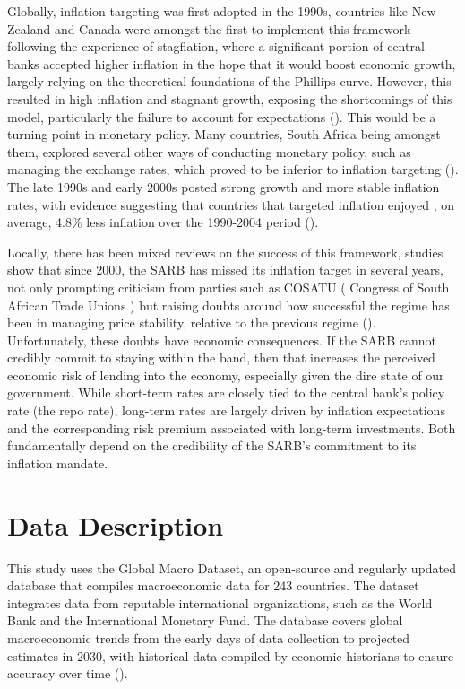 \documentclass[11pt,preprint]{elsarticle}
\numberwithin{equation}{section}
\numberwithin{figure}{section}
\numberwithin{table}{section}
\begin{document}
Globally, inflation targeting was first adopted in the 1990s, countries
like New Zealand and Canada were amongst the first to implement this
framework following the experience of stagflation, where a significant
portion of central banks accepted higher inflation in the hope that it
would boost economic growth, largely relying on the theoretical
foundations of the Phillips curve. However, this resulted in high
inflation and stagnant growth, exposing the shortcomings of this model,
particularly the failure to account for expectations
(). This would be a
turning point in monetary policy. Many countries, South Africa being
amongst them, explored several other ways of conducting monetary policy,
such as managing the exchange rates, which proved to be inferior to
inflation targeting (). The late 1990s and early 2000s posted strong growth
and more stable inflation rates, with evidence suggesting that countries
that targeted inflation enjoyed , on average, 4.8\% less inflation over
the 1990-2004 period ().

Locally, there has been mixed reviews on the success of this framework,
studies show that since 2000, the SARB has missed its inflation target
in several years, not only prompting criticism from parties such as
COSATU ( Congress of South African Trade Unions ) but raising doubts
around how successful the regime has been in managing price stability,
relative to the previous regime (). Unfortunately, these doubts have economic consequences.
If the SARB cannot credibly commit to staying within the band, then that
increases the perceived economic risk of lending into the economy,
especially given the dire state of our government. While short-term
rates are closely tied to the central bank's policy rate (the repo
rate), long-term rates are largely driven by inflation expectations and
the corresponding risk premium associated with long-term investments.
Both fundamentally depend on the credibility of the SARB's commitment to
its inflation mandate.

\section{\texorpdfstring{Data
Description\label{Data Description}}{Data Description}}\label{data-description}

This study uses the Global Macro Dataset, an open-source and regularly
updated database that compiles macroeconomic data for 243 countries. The
dataset integrates data from reputable international organizations, such
as the World Bank and the International Monetary Fund. The database
covers global macroeconomic trends from the early days of data
collection to projected estimates in 2030, with historical data compiled
by economic historians to ensure accuracy over time
().
\end{document}
